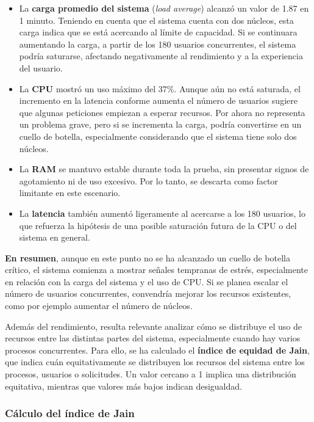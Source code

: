 \documentclass[10pt]{book}
\begin{document}
\begin{itemize}
  \item La \textbf{carga promedio del sistema} (\textit{load average}) alcanzó un valor de 1.87 en 1 minuto. Teniendo en cuenta que el sistema cuenta con dos núcleos, esta carga indica que se está acercando al límite de capacidad. Si se continuara aumentando la carga, a partir de los 180 usuarios concurrentes, el sistema podría saturarse, afectando negativamente al rendimiento y a la experiencia del usuario.

  \item La \textbf{CPU} mostró un uso máximo del 37\%. Aunque aún no está saturada, el incremento en la latencia conforme aumenta el número de usuarios sugiere que algunas peticiones empiezan a esperar recursos. Por ahora no representa un problema grave, pero si se incrementa la carga, podría convertirse en un cuello de botella, especialmente considerando que el sistema tiene solo dos núcleos.

  \item La \textbf{RAM} se mantuvo estable durante toda la prueba, sin presentar signos de agotamiento ni de uso excesivo. Por lo tanto, se descarta como factor limitante en este escenario.

  \item La \textbf{latencia} también aumentó ligeramente al acercarse a los 180 usuarios, lo que refuerza la hipótesis de una posible saturación futura de la CPU o del sistema en general.
\end{itemize}

\textbf{En resumen}, aunque en este punto no se ha alcanzado un cuello de botella crítico, el sistema comienza a mostrar señales tempranas de estrés, especialmente en relación con la carga del sistema y el uso de CPU. Si se planea escalar el número de usuarios concurrentes, convendría mejorar los recursos existentes, como por ejemplo aumentar el número de núcleos.

Además del rendimiento, resulta relevante analizar cómo se distribuye el uso de recursos entre las distintas partes del sistema, especialmente cuando hay varios procesos concurrentes. Para ello, se ha calculado el \textbf{índice de equidad de Jain}, que indica cuán equitativamente se distribuyen los recursos del sistema entre los procesos, usuarios o solicitudes. Un valor cercano a 1 implica una distribución equitativa, mientras que valores más bajos indican desigualdad.

\subsubsection*{Cálculo del índice de Jain}
\end{document}
